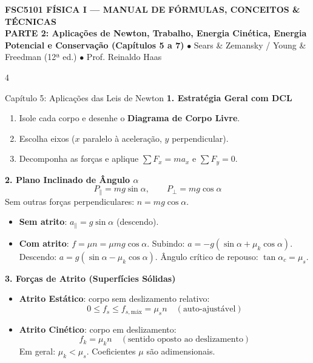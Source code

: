 \documentclass[9pt,a4paper,landscape]{extarticle}
\newcommand{\cabecalho}[1]{%
\begin{tcolorbox}[colback=primaryblue,colframe=accentcyan,arc=3pt,top=1.5pt,bottom=1.5pt,coltext=white,halign=center,breakable=false]
    {\bfseries\sffamily\normalsize FSC5101 FÍSICA I --- MANUAL DE FÓRMULAS, CONCEITOS \& TÉCNICAS}\\[0.5pt]
    {\scriptsize \textbf{#1} \quad $\bullet$ \quad Sears \& Zemansky / Young \& Freedman (12ª ed.) \quad $\bullet$ \quad Prof. Reinaldo Haas}
\end{tcolorbox}\vspace{-2pt}}
\begin{document}
\newpage
\cabecalho{PARTE 2: Aplicações de Newton, Trabalho, Energia Cinética, Energia Potencial e Conservação (Capítulos 5 a 7)}
\begin{multicols*}{4}

\begin{topicbox}{Capítulo 5: Aplicações das Leis de Newton}
\textbf{1. Estratégia Geral com DCL}
\begin{enumerate}
    \item Isole cada corpo e desenhe o \textbf{Diagrama de Corpo Livre}.
    \item Escolha eixos ($x$ paralelo à aceleração, $y$ perpendicular).
    \item Decomponha as forças e aplique $\sum F_x = ma_x$ e $\sum F_y = 0$.
\end{enumerate}

\textbf{2. Plano Inclinado de Ângulo $\alpha$}
\begin{equation*}
    P_{\parallel} = mg\sin\alpha, \qquad P_{\perp} = mg\cos\alpha
\end{equation*}
Sem outras forças perpendiculares: $n = mg\cos\alpha$.
\begin{itemize}
    \item \textbf{Sem atrito}: $a_{\parallel} = g\sin\alpha$ (descendo).
    \item \textbf{Com atrito}: $f = \mu n = \mu mg\cos\alpha$.
    Subindo: $a = -g(\sin\alpha + \mu_k\cos\alpha)$.
    Descendo: $a = g(\sin\alpha - \mu_k\cos\alpha)$.
    Ângulo crítico de repouso: $\tan\alpha_c = \mu_s$.
\end{itemize}

\textbf{3. Forças de Atrito (Superfícies Sólidas)}
\begin{itemize}
    \item \textbf{Atrito Estático}: corpo sem deslizamento relativo:
    \begin{equation*}
        0 \le f_s \le f_{s,\text{máx}} = \mu_s n \quad (\text{auto-ajustável})
    \end{equation*}
    \item \textbf{Atrito Cinético}: corpo em deslizamento:
    \begin{equation*}
        f_k = \mu_k n \quad (\text{sentido oposto ao deslizamento})
    \end{equation*}
    Em geral: $\mu_k < \mu_s$. Coeficientes $\mu$ são adimensionais.
\end{itemize}


\end{topicbox}
\end{multicols*}
\end{document}
